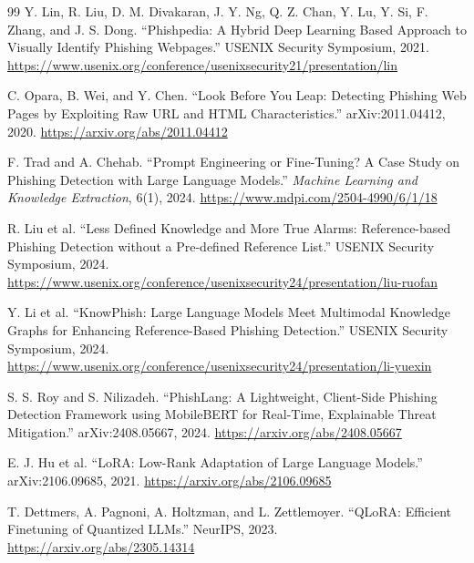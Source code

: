 \documentclass[12pt,letterpaper]{article}
\begin{document}
\begin{thebibliography}{99}
 Y. Lin, R. Liu, D. M. Divakaran, J. Y. Ng, Q. Z. Chan, Y. Lu, Y. Si, F. Zhang, and J. S. Dong. ``Phishpedia: A Hybrid Deep Learning Based Approach to Visually Identify Phishing Webpages.'' USENIX Security Symposium, 2021. \url{https://www.usenix.org/conference/usenixsecurity21/presentation/lin}

 C. Opara, B. Wei, and Y. Chen. ``Look Before You Leap: Detecting Phishing Web Pages by Exploiting Raw URL and HTML Characteristics.'' arXiv:2011.04412, 2020. \url{https://arxiv.org/abs/2011.04412}

 F. Trad and A. Chehab. ``Prompt Engineering or Fine-Tuning? A Case Study on Phishing Detection with Large Language Models.'' \textit{Machine Learning and Knowledge Extraction}, 6(1), 2024. \url{https://www.mdpi.com/2504-4990/6/1/18}

 R. Liu et al. ``Less Defined Knowledge and More True Alarms: Reference-based Phishing Detection without a Pre-defined Reference List.'' USENIX Security Symposium, 2024. \url{https://www.usenix.org/conference/usenixsecurity24/presentation/liu-ruofan}

 Y. Li et al. ``KnowPhish: Large Language Models Meet Multimodal Knowledge Graphs for Enhancing Reference-Based Phishing Detection.'' USENIX Security Symposium, 2024. \url{https://www.usenix.org/conference/usenixsecurity24/presentation/li-yuexin}

 S. S. Roy and S. Nilizadeh. ``PhishLang: A Lightweight, Client-Side Phishing Detection Framework using MobileBERT for Real-Time, Explainable Threat Mitigation.'' arXiv:2408.05667, 2024. \url{https://arxiv.org/abs/2408.05667}

 E. J. Hu et al. ``LoRA: Low-Rank Adaptation of Large Language Models.'' arXiv:2106.09685, 2021. \url{https://arxiv.org/abs/2106.09685}

 T. Dettmers, A. Pagnoni, A. Holtzman, and L. Zettlemoyer. ``QLoRA: Efficient Finetuning of Quantized LLMs.'' NeurIPS, 2023. \url{https://arxiv.org/abs/2305.14314}
\end{thebibliography}
\end{document}
